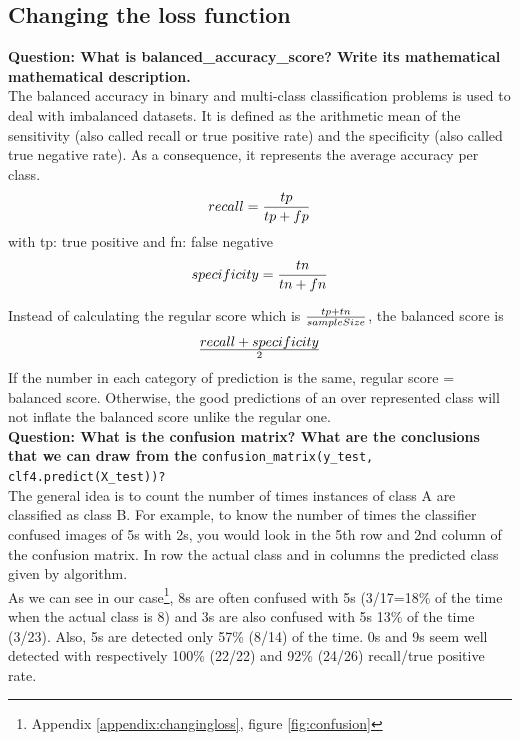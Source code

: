 \subsection{Changing the loss function}

\textbf{Question: What is balanced\_accuracy\_score? Write its mathematical mathematical description.} \\

The balanced accuracy in binary and multi-class classification problems is used to deal with imbalanced datasets. 
It is defined as the arithmetic mean of the sensitivity (also called recall or true positive rate) and the specificity (also called true negative rate). As a consequence, it represents the average accuracy per class.
\begin{equation*} recall = {tp\over tp + fp}\end{equation*} 
with tp: true positive and fn: false negative
\begin{equation*} specificity = {tn\over tn + fn}\end{equation*} 

Instead of calculating the regular score which is $tp+tn \over sampleSize$, the balanced score is 
\begin{equation*}
	recall+specificity \over 2
\end{equation*}
If the number in each category of prediction is the same, regular score = balanced score. Otherwise, the good predictions of an over represented class will not inflate the balanced score unlike the regular one.\\


\textbf{Question: What is the confusion matrix? What are the conclusions that we can draw from the} \verb|confusion_matrix(y_test, clf4.predict(X_test))?| \\

The general idea is to count the number of times instances of class A are classified as class B. For example, to know the number of times the classifier confused images of 5s with 2s, you would look in the 5th row and 2nd column of the confusion matrix. In row the actual class and in columns the predicted class given by algorithm. \\

As we can see in our case\footnote{Appendix \ref{appendix:changingloss}, figure \ref{fig:confusion}}, 8s are often confused with 5s (3/17=18\% of the time when the actual class is 8) and 3s are also confused with 5s 13\% of the time (3/23). Also, 5s are detected only 57\% (8/14) of the time. 0s and 9s seem well detected with respectively 100\% (22/22) and 92\% (24/26) recall/true positive rate.\\

